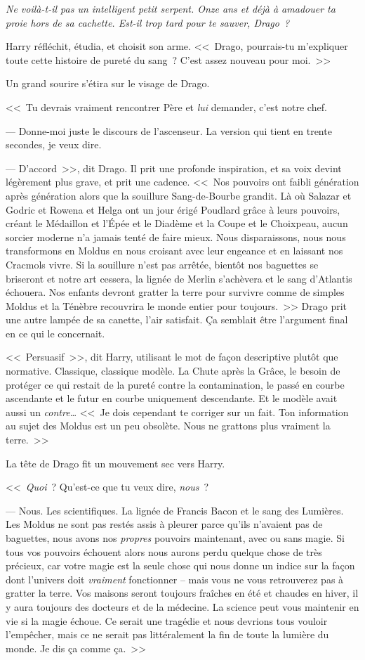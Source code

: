 \emph{Ne voilà-t-il pas un intelligent petit serpent. Onze ans et déjà à amadouer ta proie hors de sa cachette. Est-il trop tard pour te sauver, Drago~?}

Harry réfléchit, étudia, et choisit son arme. <<~Drago, pourrais-tu m'expliquer toute cette histoire de pureté du sang~? C'est assez nouveau pour moi.~>>

Un grand sourire s'étira sur le visage de Drago.

<<~Tu devrais vraiment rencontrer Père et \emph{lui} demander, c'est notre chef.

--- Donne-moi juste le discours de l'ascenseur. La version qui tient en trente secondes, je veux dire.

--- D'accord~>>, dit Drago. Il prit une profonde inspiration, et sa voix devint légèrement plus grave, et prit une cadence. <<~Nos pouvoirs ont faibli génération après génération alors que la souillure Sang-de-Bourbe grandit. Là où Salazar et Godric et Rowena et Helga ont un jour érigé Poudlard grâce à leurs pouvoirs, créant le Médaillon et l'Épée et le Diadème et la Coupe et le Choixpeau, aucun sorcier moderne n'a jamais tenté de faire mieux. Nous disparaissons, nous nous transformons en Moldus en nous croisant avec leur engeance et en laissant nos Cracmols vivre. Si la souillure n'est pas arrêtée, bientôt nos baguettes se briseront et notre art cessera, la lignée de Merlin s'achèvera et le sang d'Atlantis échouera. Nos enfants devront gratter la terre pour survivre comme de simples Moldus et la Ténèbre recouvrira le monde entier pour toujours.~>> Drago prit une autre lampée de sa canette, l'air satisfait. Ça semblait être l'argument final en ce qui le concernait.

<<~Persuasif~>>, dit Harry, utilisant le mot de façon descriptive plutôt que normative. Classique, classique modèle. La Chute après la Grâce, le besoin de protéger ce qui restait de la pureté contre la contamination, le passé en courbe ascendante et le futur en courbe uniquement descendante. Et le modèle avait aussi un \emph{contre}… <<~Je dois cependant te corriger sur un fait. Ton information au sujet des Moldus est un peu obsolète. Nous ne grattons plus vraiment la terre.~>>

La tête de Drago fit un mouvement sec vers Harry.

<<~\emph{Quoi}~? Qu'est-ce que tu veux dire, \emph{nous}~?

--- Nous. Les scientifiques. La lignée de Francis Bacon et le sang des Lumières. Les Moldus ne sont pas restés assis à pleurer parce qu'ils n'avaient pas de baguettes, nous avons nos \emph{propres} pouvoirs maintenant, avec ou sans magie. Si tous vos pouvoirs échouent alors nous aurons perdu quelque chose de très précieux, car votre magie est la seule chose qui nous donne un indice sur la façon dont l'univers doit \emph{vraiment} fonctionner -- mais vous ne vous retrouverez pas à gratter la terre. Vos maisons seront toujours fraîches en été et chaudes en hiver, il y aura toujours des docteurs et de la médecine. La science peut vous maintenir en vie si la magie échoue. Ce serait une tragédie et nous devrions tous vouloir l'empêcher, mais ce ne serait pas littéralement la fin de toute la lumière du monde. Je dis ça comme ça.~>>

